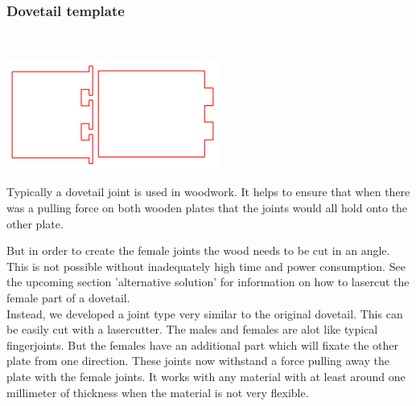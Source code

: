 \documentclass[../ClassicThesis.tex]{subfiles}
\begin{document}
\subsubsection{Dovetail template}
\\
    \begin{minipage}{0.4\textwidth}
    \includegraphics[width=1\columnwidth]{Images/schwalbe.png}
    \end{minipage}
    \begin{minipage}{0.6\textwidth}
    Typically a dovetail joint is used in woodwork. It helps to ensure that when there was a pulling force on both wooden plates that the joints would all hold onto the other plate.\\
    \end{minipage}
    But in order to create the female joints the wood needs to be cut in an angle. This is not possible without inadequately high time and power consumption. See the upcoming section 'alternative solution' for information on how to lasercut the female part of a dovetail.\\
    Instead, we developed a joint type very similar to the original dovetail. This can be easily cut with a lasercutter.
    The males and females are alot like typical fingerjoints. But the females have an additional part which will fixate the other plate from one direction.
    These joints now withstand a force pulling away the plate with the female joints. It works with any material with at least around one millimeter of thickness when the material is not very flexible.
\end{document}
